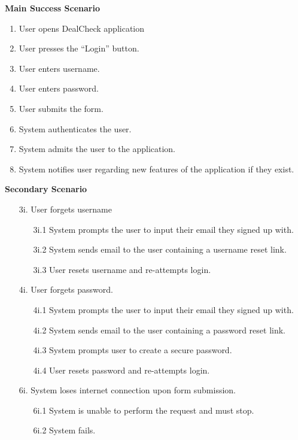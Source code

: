 \documentclass[]{article}
\begin{document}
\begin{enumerate}[{\bf {BE}1.}]
	{\bf Main Success Scenario}
		\begin{enumerate}[1.]
			\item User opens DealCheck application
			\item User presses the “Login” button.
			\item User enters username.
			\item User enters password.
			\item User submits the form.
			\item System authenticates the user.
			\item System admits the user to the application.
			\item System notifies user regarding new features of the application if they exist.
		\end{enumerate}
		{\bf Secondary Scenario} \\
            \begin{enumerate}
                \item [3i.] User forgets username
    		\begin{enumerate}
    			\item [3i.1] System prompts the user to input their email they signed up with.
    			\item [3i.2] System sends email to the user containing a username reset link.
    			\item [3i.3] User resets username and re-attempts login.
    		\end{enumerate}
    		\item [4i.] User forgets password.
    		\begin{enumerate}
    			\item [4i.1] System prompts the user to input their email they signed up with.
    			\item [4i.2] System sends email to the user containing a password reset link.
    			\item [4i.3] System prompts user to create a secure password.
    			\item [4i.4] User resets password and re-attempts login.
    		\end{enumerate}
    		\item [6i.] System loses internet connection upon form submission.
    		\begin{enumerate}
    			\item [6i.1] System is unable to perform the request and must stop.
    			\item [6i.2] System fails.
    		\end{enumerate}
            \end{enumerate}
\end{enumerate}
\end{document}
